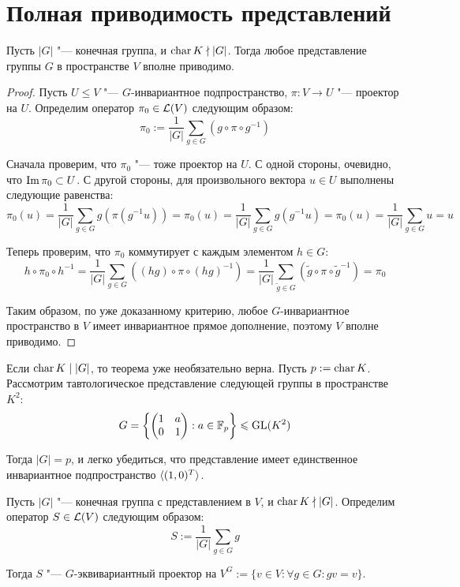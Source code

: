\section{Полная приводимость представлений}

\begin{theorem}
	Пусть $|G|$ "--- конечная группа, и $\operatorname{char}{K} \nmid |G|$. Тогда любое представление группы $G$ в пространстве $V$ вполне приводимо.
\end{theorem}

\begin{proof}
	Пусть $U \le V$ "--- $G$-инвариантное подпространство, $\pi : V \to U$ "--- проектор на $U$. Определим оператор $\pi_0 \in \mathcal L(V)$ следующим образом:
	\[\pi_0 := \frac1{|G|}\sum_{g \in G}(g\circ\pi\circ g^{-1})\]
	
	Сначала проверим, что $\pi_0$ "--- тоже проектор на $U$. С одной стороны, очевидно, что $\operatorname{Im}\pi_0 \subset U$. С другой стороны, для произвольного вектора $u \in U$ выполнены следующие равенства:
	\[\pi_0(u) = \frac1{|G|}\sum_{g \in G}g(\pi(g^{-1}u)) = \pi_0(u) = \frac1{|G|}\sum_{g \in G}g(g^{-1}u) = \pi_0(u) = \frac1{|G|}\sum_{g \in G}u = u\]
	
	Теперь проверим, что $\pi_0$ коммутирует с каждым элементом $h \in G$:
	\[h\circ\pi_0\circ h^{-1} = \frac1{|G|}\sum_{g \in G}((hg)\circ\pi\circ (hg)^{-1}) = \frac1{|G|}\sum_{\widetilde g \in G}(\widetilde g\circ\pi\circ \widetilde g^{-1}) = \pi_0\]
	
	Таким образом, по уже доказанному критерию, любое $G$-инвариантное пространство в $V$ имеет инвариантное прямое дополнение, поэтому $V$ вполне приводимо.
\end{proof}

\begin{note}
	Если $\operatorname{char}{K} \mid |G|$, то теорема уже необязательно верна. Пусть $p := \operatorname{char}{K}$. Рассмотрим тавтологическое представление следующей группы в пространстве $K^2$:
	\[G = \left\{\begin{pmatrix}
		1&a\\
		0&1
	\end{pmatrix} : a \in \mathbb{F}_p\right\} \leqslant \operatorname{GL}(K^2)\]

	Тогда $|G| = p$, и легко убедиться, что представление имеет единственное инвариантное подпространство $\langle(1, 0)^T\rangle$.
\end{note}

\begin{theorem}
	Пусть $|G|$ "--- конечная группа с представлением в $V$, и $\operatorname{char}{K} \nmid |G|$. Определим оператор $S \in \mathcal L(V)$ следующим образом:
	\[S := \frac1{|G|}\sum_{g \in G}g\]
	
	Тогда $S$ "--- $G$-эквивариантный проектор на $V^G := \{v \in V: \forall g \in G: gv=v\}$.
\end{theorem}


